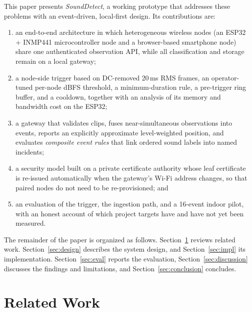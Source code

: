 \documentclass[conference]{IEEEtran}
\newcommand{\ms}{\,ms}
\begin{document}
This paper presents \emph{SoundDetect}, a working prototype that addresses these problems with an event-driven, local-first design. Its contributions are:
\begin{enumerate}
\item an end-to-end architecture in which heterogeneous wireless nodes (an ESP32 + INMP441 microcontroller node and a browser-based smartphone node) share one authenticated observation API, while all classification and storage remain on a local gateway;
\item a node-side trigger based on DC-removed 20\ms{} RMS frames, an operator-tuned per-node dBFS threshold, a minimum-duration rule, a pre-trigger ring buffer, and a cooldown, together with an analysis of its memory and bandwidth cost on the ESP32;
\item a gateway that validates clips, fuses near-simultaneous observations into events, reports an explicitly approximate level-weighted position, and evaluates \emph{composite event rules} that link ordered sound labels into named incidents;
\item a security model built on a private certificate authority whose leaf certificate is re-issued automatically when the gateway's Wi-Fi address changes, so that paired nodes do not need to be re-provisioned; and
\item an evaluation of the trigger, the ingestion path, and a 16-event indoor pilot, with an honest account of which project targets have and have not yet been measured.
\end{enumerate}

The remainder of the paper is organized as follows. Section~\ref{sec:related} reviews related work. Section~\ref{sec:design} describes the system design, and Section~\ref{sec:impl} its implementation. Section~\ref{sec:eval} reports the evaluation, Section~\ref{sec:discussion} discusses the findings and limitations, and Section~\ref{sec:conclusion} concludes.

\section{Related Work}
\label{sec:related}
\end{document}
